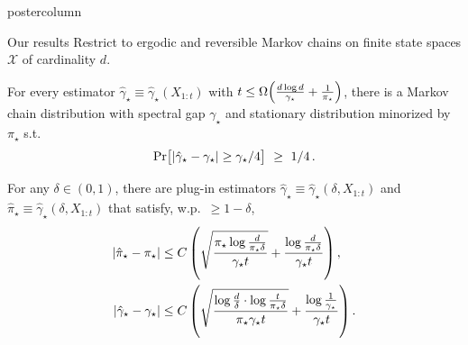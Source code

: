 \documentclass[notheorems,final]{beamer}
\newcommand{\GREEN}[1]{\textcolor{boldgreen}{#1}}
\newcommand\pimin{\ensuremath{\pi_{\star}}}
\newcommand\gap{\ensuremath{\gamma_{\star}}}
\newcommand\hatgap{\ensuremath{\hat{\gamma}_{\star}}}
\newcommand\hatpimin{\ensuremath{\hat{\pi}_{\star}}}
\newcommand\states{\ensuremath{\mathcal{X}}}
\begin{document}
\begin{frame}{}
\begin{columns}
\begin{column}{0.24\textwidth}
\begin{beamercolorbox}[center,wd=\textwidth]{postercolumn}
\begin{minipage}[T]{.95\textwidth}
{              \begin{block}{Our results}
                Restrict to \GREEN{ergodic and reversible Markov
                chains} on \GREEN{finite state spaces} $\states$ of
                cardinality $d$.

                \bigskip
                \begin{theorem}
                  For every estimator $\hatgap \equiv
                  \hatgap(X_{1:t})$ with $t \leq \Omega\Parens{
                  \frac{d \log d}{\gap} + \frac1{\pimin} }$, there is
                  a Markov chain distribution with spectral gap $\gap$
                  and stationary distribution minorized by $\pimin$
                  s.t.
                  \[
                    \Pr\Brackets{ |\hatgap - \gap| \geq \gap/4 }
                    \ \geq \ 1/4
                    \,.
                  \]
                \end{theorem}

                \begin{theorem}
                  For any $\delta{\in}(0,1)$, there are plug-in estimators
                  $\hatgap \equiv \hatgap(\delta,X_{1:t})$ and
                  $\hatpimin \equiv \hatgap(\delta,X_{1:t})$ that satisfy,
                  w.p.~${\geq}1-\delta$,
                  \begin{align*}
                    \Abs{\hatpimin-\pimin}
                    & \leq
                    C \,
                    \Parens{
                      \sqrt{\frac{\pimin\log\frac{d}{\pimin\delta}}{\gap t}}
                      +
                      \frac{\log\frac{d}{\pimin\delta}}{\gap t}
                    }
                    \,,
                    \\
                    \Abs{\hatgap-\gap}
                    & \leq
                    C \,
                    \Parens{
                      \sqrt{\frac{\log\frac{d}{\delta}\cdot\log\frac{t}{\pimin\delta}}{\pimin\gap t}}
                      + \frac{\log\frac{1}{\gap}}{\gap t}  
                    }
                    \,.
                  \end{align*}
                \end{theorem}


\end{block}}
\end{minipage}
\end{beamercolorbox}
\end{column}
\end{columns}
\end{frame}
\end{document}
